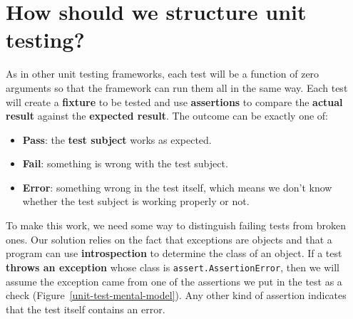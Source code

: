 \documentclass[krantzl]{krantz}
\newcommand{\figref}[1]{Figure~\ref{#1}}
\newcommand{\glossref}[1]{\textbf{#1}}
\begin{document}
\section{How should we structure unit testing?}\label{unit-test-structure}


As in other unit testing frameworks,
each test will be a function of zero arguments
so that the framework can run them all in the same way.
Each test will create a \glossref{fixture} to be tested
and use \glossref{assertions}
to compare the \glossref{actual result}
against the \glossref{expected result}.
The outcome can be exactly one of:

\begin{itemize}

\item 

\glossref{Pass}:
    the \glossref{test subject} works as expected.



\item 

\glossref{Fail}:
    something is wrong with the test subject.



\item 

\glossref{Error}:
    something wrong in the test itself,
    which means we don’t know whether the test subject is working properly or not.



\end{itemize}


To make this work,
we need some way to distinguish failing tests from broken ones.
Our solution relies on the fact that exceptions are objects
and that a program can use \glossref{introspection}
to determine the class of an object.
If a test \glossref{throws an exception} whose class is \texttt{assert.AssertionError},
then we will assume the exception came from
one of the assertions we put in the test as a check
(\figref{unit-test-mental-model}).
Any other kind of assertion indicates that the test itself contains an error.
\end{document}
